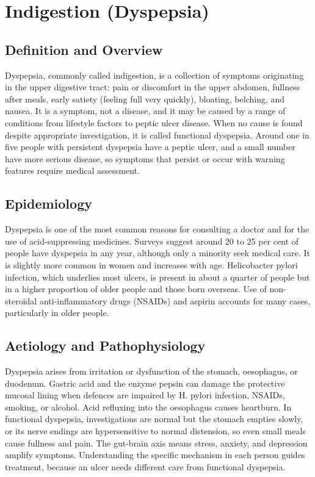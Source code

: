 \chapter{Indigestion (Dyspepsia)}

\section*{Definition and Overview}
Dyspepsia, commonly called indigestion, is a collection of symptoms originating in the upper digestive tract: pain or discomfort in the upper abdomen, fullness after meals, early satiety (feeling full very quickly), bloating, belching, and nausea. It is a symptom, not a disease, and it may be caused by a range of conditions from lifestyle factors to peptic ulcer disease. When no cause is found despite appropriate investigation, it is called functional dyspepsia. Around one in five people with persistent dyspepsia have a peptic ulcer, and a small number have more serious disease, so symptoms that persist or occur with warning features require medical assessment.

\section*{Epidemiology}
Dyspepsia is one of the most common reasons for consulting a doctor and for the use of acid-suppressing medicines. Surveys suggest around 20 to 25 per cent of people have dyspepsia in any year, although only a minority seek medical care. It is slightly more common in women and increases with age. Helicobacter pylori infection, which underlies most ulcers, is present in about a quarter of people but in a higher proportion of older people and those born overseas. Use of non-steroidal anti-inflammatory drugs (NSAIDs) and aspirin accounts for many cases, particularly in older people.

\section*{Aetiology and Pathophysiology}
Dyspepsia arises from irritation or dysfunction of the stomach, oesophagus, or duodenum. Gastric acid and the enzyme pepsin can damage the protective mucosal lining when defences are impaired by H. pylori infection, NSAIDs, smoking, or alcohol. Acid refluxing into the oesophagus causes heartburn. In functional dyspepsia, investigations are normal but the stomach empties slowly, or its nerve endings are hypersensitive to normal distension, so even small meals cause fullness and pain. The gut-brain axis means stress, anxiety, and depression amplify symptoms. Understanding the specific mechanism in each person guides treatment, because an ulcer needs different care from functional dyspepsia.

